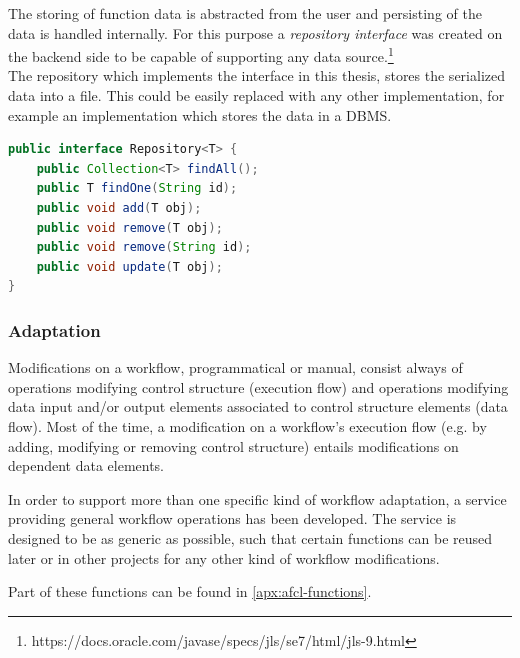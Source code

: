 \documentclass[a4paper,top=25mm,bottom=25mm,12pt,pdftex,halfparskip,twoside,bibtotoc,numbers=noenddot]{scrbook}
\begin{document}
The storing of function data is abstracted from the user and persisting of the data is handled internally. For this purpose a \textit{repository interface} was created on the backend side to be capable of supporting any data source.\footnote{https://docs.oracle.com/javase/specs/jls/se7/html/jls-9.html}\\
The repository which implements the interface in this thesis, stores the serialized data into a file. This could be easily replaced with any other implementation, for example an implementation which stores the data in a DBMS.

\vspace{0.25cm}
\begin{lstlisting}[language=Java, caption=Repository Interface]
public interface Repository<T> {
    public Collection<T> findAll();
    public T findOne(String id);
    public void add(T obj);
    public void remove(T obj);
    public void remove(String id);
    public void update(T obj);
}
\end{lstlisting}

\newpage

\subsubsection{Adaptation}
\label{sec:backend-adaptation}

Modifications on a workflow, programmatical or manual, consist always of operations modifying control structure (execution flow) and operations modifying data input and/or output elements associated to control structure elements (data flow). Most of the time, a modification on a workflow's execution flow (e.g. by adding, modifying or removing control structure) entails modifications on dependent data elements.

In order to support more than one specific kind of workflow adaptation, a service providing general workflow operations has been developed. The service is designed to be as generic as possible, such that certain functions can be reused later or in other projects for any other kind of workflow modifications. 

Part of these functions can be found in \ref{apx:afcl-functions}.


%

\end{document}
